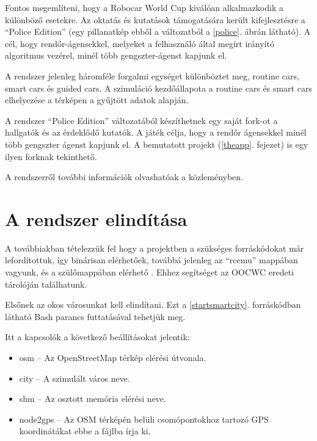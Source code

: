 \documentclass[a4paper,12pt]{report}
\begin{document}
\vspace{2mm}
Fontos megemlíteni, hogy a Robocar World Cup kiválóan alkalmazkodik a különböző esetekre. Az oktatás és kutatások támogatására került kifejlesztésre a ``Police Edition'' (egy pillanatkép ebből a változatból a \ref{police}. ábrán látható). A cél, hogy rendőr-ágensekkel, melyeket a felhasználó által megírt irányító algoritmus vezérel, minél több gengszter-ágenst kapjunk el.

\vspace{2mm}
A rendszer jelenleg háromféle forgalmi egységet különböztet meg, routine cars, smart cars és guided cars. A szimuláció kezdőállapota a routine cars és smart cars elhelyezése a térképen a gyűjtött adatok alapján.

\vspace{2mm}
A rendszer ``Police Edition'' változatából készíthetnek egy saját fork-ot a hallgatók és az érdeklődő kutatók. A játék célja, hogy a rendőr ágensekkel minél több gengszter ágenst kapjunk el. A bemutatott projekt (\ref{theapp}. fejezet) is egy ilyen forknak tekinthető.

\vspace{2mm}
A rendszerről további információk olvashatóak a \cite{infocomjournal} közleményben.

\section{A rendszer elindítása}
\label{howtostart}

A továbbiakban tételezzük fel hogy a projektben a szükséges forráskódokat már lefordítottuk, így binárisan elérhetőek, továbbá jelenleg az ``rcemu'' mappában vagyunk, és a szülőmappában elérhető . Ehhez segítséget az OOCWC eredeti tárolóján \cite{oocwcrepo} találhatunk.

\vspace{2mm}
Elsőnek az okos városunkat kell elindítani. Ezt a \ref{startsmartcity}. forráskódban látható Bash parancs futtatásával  tehetjük meg.



Itt a kapcsolók a következő beállításokat jelentik:

\begin{itemize}
\item osm -- Az OpenStreetMap térkép elérési útvonala.
\item city -- A szimulált város neve.
\item shm -- Az osztott memória elérési neve.
\item node2gps -- Az OSM térképén belüli csomópontokhoz tartozó GPS koordinátákat ebbe a fájlba írja ki.
\label{node2gps}
\end{itemize}
\end{document}
